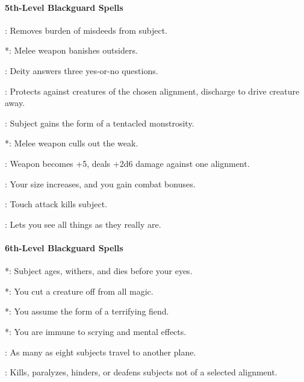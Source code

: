 \paragraph{5th-Level Blackguard Spells}
\begin{list}{}{\leftmargin=1em}
 \item {}: Removes burden of misdeeds from subject.
 \item {}*: Melee weapon banishes outsiders.
 \item {}: Deity answers three yes-or-no questions.
 \item {}: Protects against creatures of the chosen alignment, discharge to drive creature away.
 \item {}: Subject gains the form of a tentacled monstrosity. %
 \item {}*: Melee weapon culls out the weak. %
 \item {}: Weapon becomes +5, deals +2d6 damage against one alignment.
 \item {}: Your size increases, and you gain combat bonuses.
 \item {}: Touch attack kills subject. %
 \item {}: Lets you see all things as they really are.
\end{list}
\paragraph{6th-Level Blackguard Spells}
\begin{list}{}{\leftmargin=1em}
 \item {}*: Subject ages, withers, and dies before your eyes. %
 \item {}*: You cut a creature off from all magic.%
 \item {}*: You assume the form of a terrifying fiend.
 \item {}*: You are immune to scrying and mental effects.
 \item {}: As many as eight subjects travel to another plane.
 \item {}: Kills, paralyzes, hinders, or deafens subjects not of a selected alignment.
\end{list}